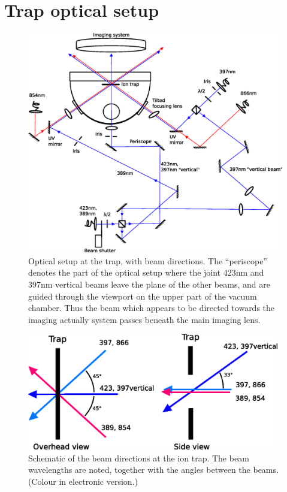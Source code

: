 \section{Trap optical setup}
\begin{figure}[h!t]
\centering
\includegraphics[width=13.5cm]{chapter4/trapoptics/trapoptics}
\caption[Optical setup at the trap]{Optical setup at the trap, with beam directions. The ``periscope'' denotes the part of the optical setup where the joint 423nm and 397nm vertical beams leave the plane of the other beams, and are guided through the viewport on the upper part of the vacuum chamber. Thus the beam which appears to be directed towards the imaging actually system passes beneath the main imaging lens. \cversion}
\label{trapoptical}
\end{figure} 

\begin{figure}[h!t]
\centering
\includegraphics[width=11cm]{chapter4/trapoptics/traplaserdir2}
\caption[Beam directions at the trap]{Schematic of the beam directions at the ion trap. The beam wavelengths are noted, together with the angles between the beams. (Colour in electronic version.)}
\label{beamdirections}
\end{figure} 


